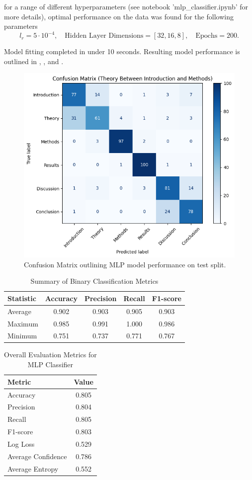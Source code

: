 for a range of different hyperparameters (see notebook 'mlp\_classifier.ipynb' for more details), optimal performance on the data was found for the following parameters
$$l_r = 5\cdot 10^{-4}, \quad \text{Hidden Layer Dimensions} = [32, 16, 8], \quad \text{Epochs} = 200.$$

Model fitting completed in under 10 seconds. Resulting model performance is outlined in , ,  and .

\begin{figure}%
    \centering
    \includegraphics[width=0.6\linewidth]{media/MLP_confusion_matrix.png}
    \caption{Confusion Matrix outlining MLP model performance on test split.}
    \label{fig:105}
\end{figure}
\begin{table}[ht]
\centering
\caption{Summary of Binary Classification Metrics}
\begin{tabular}{lcccc}
\toprule
\textbf{Statistic} & \textbf{Accuracy} & \textbf{Precision} & \textbf{Recall} & \textbf{F1-score} \\
\midrule
Average & 0.902 & 0.903 & 0.905 & 0.903 \\
Maximum & 0.985 & 0.991 & 1.000 & 0.986 \\
Minimum & 0.751 & 0.737 & 0.771 & 0.767 \\
\bottomrule
\end{tabular}
\label{tab:108}
\end{table}

\begin{table}[ht]
\centering
\caption{Overall Evaluation Metrics for MLP Classifier}
\begin{tabular}{lc}
\toprule
\textbf{Metric} & \textbf{Value} \\
\midrule
Accuracy               & 0.805 \\
Precision   & 0.804 \\
Recall     & 0.805 \\
F1-score    & 0.803 \\
Log Loss               & 0.529 \\
Average Confidence     & 0.786 \\
Average Entropy        & 0.552 \\
\bottomrule
\end{tabular}
\label{tab:109}
\end{table}

